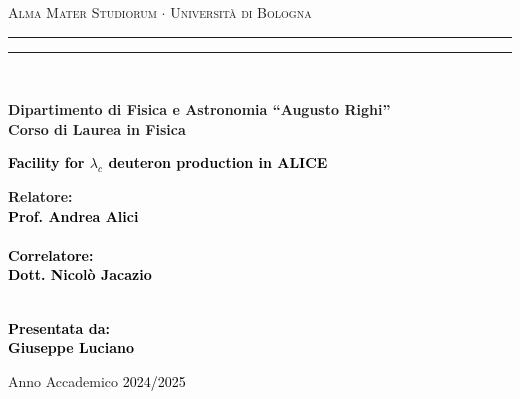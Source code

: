 \documentclass[12pt,a4paper]{book}
\begin{document}
	\begin{titlepage}
		\begin{center}
			{{\Large{\textsc{Alma Mater Studiorum $\cdot$ Universit\`a di Bologna}}}} 
			\rule[0.1cm]{15.8cm}{0.1mm}
			\rule[0.5cm]{15.8cm}{0.6mm}
			\\\vspace{3mm}
			
			{\small{\bf Dipartimento di Fisica e Astronomia “Augusto Righi”\\
					Corso di Laurea in Fisica}}
			
		\end{center}
		
		\vspace{23mm}
		
		\begin{center}\textcolor{black}{
				{\LARGE{\bf Facility for $\lambda_c$ deuteron production in ALICE}}\\
		}\end{center}
		
		\vspace{50mm} \par \noindent
		
		\begin{minipage}[t]{0.47\textwidth}
			{\large{\bf Relatore: \vspace{2mm}\\\textcolor{black}{
						Prof. Andrea Alici}\\\\
					\textcolor{black}{
						\bf Correlatore: 
						\vspace{2mm}\\
						Dott. Nicolò Jacazio \\\\}}}
		\end{minipage}
		\hfill
		\begin{minipage}[t]{0.47\textwidth}\raggedleft \textcolor{black}{
				{\large{\bf Presentata da:
						\vspace{2mm}\\
						Giuseppe Luciano}}}
		\end{minipage}
		
		\vspace{40mm}
		
		\begin{center}
			Anno Accademico \textcolor{black}{ 2024/2025}
		\end{center}
		
	\end{titlepage}
	\newpage
	
\end{document}
